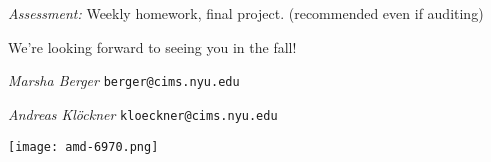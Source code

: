 \emph{Assessment:} Weekly homework, final
project. (recommended even if auditing)

We're looking forward to seeing you in the fall!
\vspace{1.5ex}

\hfill
\begin{minipage}{0.4\columnwidth}
  \raggedright
  \emph{Marsha Berger}
  \small\texttt{berger@cims.nyu.edu}
\end{minipage}
\hfill
\begin{minipage}{0.5\columnwidth}
  \raggedright
  \emph{Andreas Klöckner}
  \small \texttt{kloeckner@cims.nyu.edu}
\end{minipage}

\centering
\texttt{[image: amd-6970.png]}
